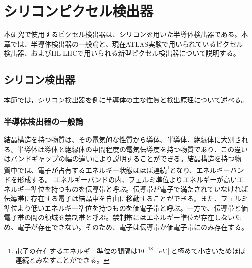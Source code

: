 \chapter{シリコンピクセル検出器}
\label{sec:chap2}
本研究で使用するピクセル検出器は、シリコンを用いた半導体検出器である。本章では、半導体検出器の一般論と、現在ATLAS実験で用いられているピクセル検出器、およびHL-LHCで用いられる新型ピクセル検出器について説明する。

\section{シリコン検出器}
\label{sec:handoutai}

本節では，シリコン検出器を例に半導体の主な性質と検出原理について述べる。

\subsection{半導体検出器の一般論}
\label{sec:handoutai}
結晶構造を持つ物質は、その電気的な性質から導体、半導体、絶縁体に大別される。半導体は導体と絶縁体の中間程度の電気伝導度を持つ物質であり、この違いはバンドギャップの幅の違いにより説明することができる。結晶構造を持つ物質中では、電子が占有するエネルギー状態はほぼ連続\footnote{電子の存在するエネルギー準位の間隔は$10^{-18}\ [\si{eV}]$と極めて小さいためほぼ連続とみなすことができる。}となり、エネルギーバンドを形成する。
エネルギーバンドの内、フェルミ準位よりエネルギーが高いエネルギー準位を持つものを伝導帯と呼ぶ。伝導帯が電子で満たされていなければ伝導帯に存在する電子は結晶中を自由に移動することができる。また、フェルミ準位より低いエネルギー準位を持つものを価電子帯と呼ぶ。一方で、伝導帯と価電子帯の間の領域を禁制帯と呼ぶ。禁制帯にはエネルギー準位が存在しないため、電子が存在できない。そのため、電子は伝導帯か価電子帯にのみ存在する。

